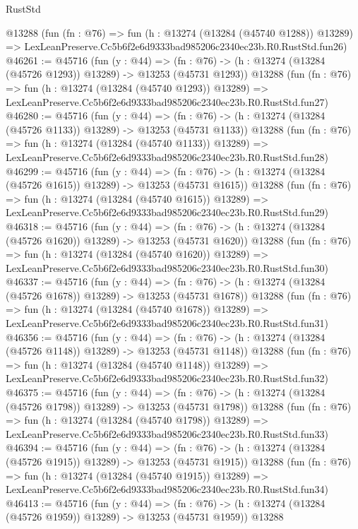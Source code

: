 \begin{lexlean}{RustStd}
\begin{coremodule}
    @13288
    (fun (fn : @76) =>
    fun (h : @13274 (@13284 (@45740 @1288)) @13289) =>
    LexLeanPreserve.Cc5b6f2e6d9333bad985206c2340ec23b.R0.RustStd.fun26)
@46261 := @45716
    (fun (y : @44) =>
    (fn : @76) -> (h : @13274 (@13284 (@45726 @1293)) @13289) -> @13253 (@45731 @1293))
    @13288
    (fun (fn : @76) =>
    fun (h : @13274 (@13284 (@45740 @1293)) @13289) =>
    LexLeanPreserve.Cc5b6f2e6d9333bad985206c2340ec23b.R0.RustStd.fun27)
@46280 := @45716
    (fun (y : @44) =>
    (fn : @76) -> (h : @13274 (@13284 (@45726 @1133)) @13289) -> @13253 (@45731 @1133))
    @13288
    (fun (fn : @76) =>
    fun (h : @13274 (@13284 (@45740 @1133)) @13289) =>
    LexLeanPreserve.Cc5b6f2e6d9333bad985206c2340ec23b.R0.RustStd.fun28)
@46299 := @45716
    (fun (y : @44) =>
    (fn : @76) -> (h : @13274 (@13284 (@45726 @1615)) @13289) -> @13253 (@45731 @1615))
    @13288
    (fun (fn : @76) =>
    fun (h : @13274 (@13284 (@45740 @1615)) @13289) =>
    LexLeanPreserve.Cc5b6f2e6d9333bad985206c2340ec23b.R0.RustStd.fun29)
@46318 := @45716
    (fun (y : @44) =>
    (fn : @76) -> (h : @13274 (@13284 (@45726 @1620)) @13289) -> @13253 (@45731 @1620))
    @13288
    (fun (fn : @76) =>
    fun (h : @13274 (@13284 (@45740 @1620)) @13289) =>
    LexLeanPreserve.Cc5b6f2e6d9333bad985206c2340ec23b.R0.RustStd.fun30)
@46337 := @45716
    (fun (y : @44) =>
    (fn : @76) -> (h : @13274 (@13284 (@45726 @1678)) @13289) -> @13253 (@45731 @1678))
    @13288
    (fun (fn : @76) =>
    fun (h : @13274 (@13284 (@45740 @1678)) @13289) =>
    LexLeanPreserve.Cc5b6f2e6d9333bad985206c2340ec23b.R0.RustStd.fun31)
@46356 := @45716
    (fun (y : @44) =>
    (fn : @76) -> (h : @13274 (@13284 (@45726 @1148)) @13289) -> @13253 (@45731 @1148))
    @13288
    (fun (fn : @76) =>
    fun (h : @13274 (@13284 (@45740 @1148)) @13289) =>
    LexLeanPreserve.Cc5b6f2e6d9333bad985206c2340ec23b.R0.RustStd.fun32)
@46375 := @45716
    (fun (y : @44) =>
    (fn : @76) -> (h : @13274 (@13284 (@45726 @1798)) @13289) -> @13253 (@45731 @1798))
    @13288
    (fun (fn : @76) =>
    fun (h : @13274 (@13284 (@45740 @1798)) @13289) =>
    LexLeanPreserve.Cc5b6f2e6d9333bad985206c2340ec23b.R0.RustStd.fun33)
@46394 := @45716
    (fun (y : @44) =>
    (fn : @76) -> (h : @13274 (@13284 (@45726 @1915)) @13289) -> @13253 (@45731 @1915))
    @13288
    (fun (fn : @76) =>
    fun (h : @13274 (@13284 (@45740 @1915)) @13289) =>
    LexLeanPreserve.Cc5b6f2e6d9333bad985206c2340ec23b.R0.RustStd.fun34)
@46413 := @45716
    (fun (y : @44) =>
    (fn : @76) -> (h : @13274 (@13284 (@45726 @1959)) @13289) -> @13253 (@45731 @1959))
    @13288

\end{coremodule}
\end{lexlean}

